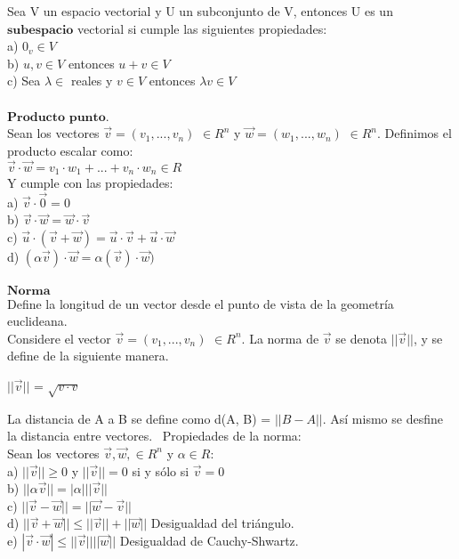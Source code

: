 \documentclass[secnumarabic,balancelastpage,amsmath,amssymb]{article}
\begin{document}
Sea V un espacio vectorial y U un subconjunto de V, entonces U es un $\textbf{subespacio}$ vectorial si cumple las siguientes propiedades:\\
a) $0_{v} \in V$\\
b) $ u, v \in V$ entonces $u+v \in V $\\
c) Sea $\lambda \in $ reales y $v \in V$ entonces $\lambda v \in V$\\\\
$\textbf{Producto punto}$. \\
Sean los vectores $\vec{v}=(v_{1}, ..., v_{n})$ $\in R^{n}$ y $\vec{w}=(w_{1}, ..., w_{n})$ $\in R^{n}$. Definimos el producto escalar como: \\
$\vec{v} \cdot \vec{w} = v_{1} \cdot w_{1} + ... + v_{n} \cdot w_{n} \in R$\\ Y cumple con las propiedades:\\ 
a) $\vec{v} \cdot \vec{0} = 0$\\
b) $\vec{v} \cdot \vec{w} = \vec{w} \cdot \vec{v}$ \\
c) $\vec{u} \cdot (\vec{v}+\vec{w}) = \vec{u} \cdot \vec{v} +\vec{u} \cdot \vec{w}$\\
d) $(\alpha \vec{v}) \cdot \vec{w} = \alpha (\vec{v}) \cdot \vec{w}) $\\\\
$\textbf{Norma}$\\
Define la longitud de un vector desde el punto de vista de la geometría euclideana. \\
Considere el vector $\vec{v} = (v_{1}, ..., v_{n})$ $\in R^{n}$. La norma de $\vec{v}$ se denota $||\vec{v}||$, y se define de la siguiente manera.\\
\begin{center}
$||\vec{v}||$ = $\sqrt{v \cdot v}$
\end{center} La distancia de A a B se define como d(A, B) = $|| B-A||$. Así mismo se desfine la distancia entre vectores. \
Propiedades de la norma:\\
Sean los vectores $\vec{v}, \vec{w}, \in R^{n}$ y $\alpha \in R$:\\
a) $||\vec{v}|| \geq 0$ y $||\vec{v}|| = 0$ si y sólo si $\vec{v} = 0 $\\
b) $||\alpha \vec{v} || = |\alpha| ||\vec{v}||$\\
c) $||\vec{v} - \vec{w} || = ||\vec{w} - \vec{v}||$\\
d) $||\vec{v} + \vec{w} || \leq ||\vec{v}|| + ||\vec{w}||$ Desigualdad del triángulo. \\
e) $|\vec{v} \cdot \vec{w}| \leq ||\vec{v}||||\vec{w}||$ Desigualdad de Cauchy-Shwartz. \\
\end{document}
